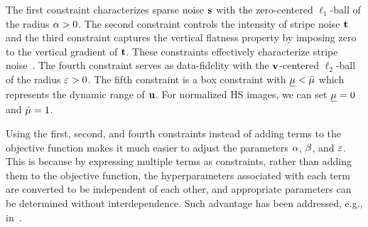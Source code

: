 \documentclass[10pt,journal]{IEEEtran}
\begin{document}
The first constraint characterizes sparse noise $\mathbf{s}$ with the zero-centered $\ell_1$-ball of the radius $\alpha > 0$.
The second constraint controls the intensity of stripe noise $\mathbf{t}$ and the third constraint captures the vertical flatness property by imposing zero to the vertical gradient of $\mathbf{t}$.
These constraints effectively characterize stripe noise~\cite{Naganuma2022Destriping}.
The fourth constraint serves as data-fidelity with the $\mathbf{v}$-centered $\ell_2$-ball of the radius $\varepsilon > 0$.
The fifth constraint is a box constraint with $\underline{\mu} < \bar{\mu}$ which represents the dynamic range of $\mathbf{u}$.
For normalized HS images, we can set $\underline{\mu} = 0$ and $\bar{\mu} = 1$.


Using the first, second, and fourth constraints instead of adding terms to the objective function makes it much easier to adjust the parameters $\alpha$, $\beta$, and $\varepsilon$.
This is because by expressing multiple terms as constraints, rather than adding them to the objective function, the hyperparameters associated with each term are converted to be independent of each other, and appropriate parameters can be determined without interdependence.
Such advantage has been addressed, e.g., in~\cite{Constraint_Afonso2011,Constraint_Chierchia2015, Constraint_Ono2015, Constraint_Ono2017, Constraint_Ono2019}.

\end{document}
